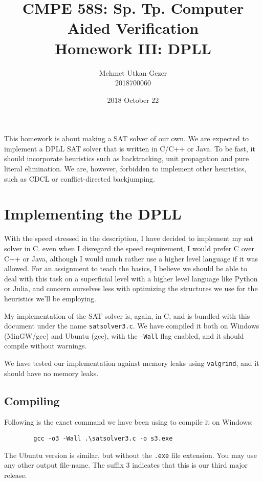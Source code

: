 \documentclass{article}
\title{CMPE 58S: Sp. Tp. Computer Aided Verification \\ Homework III: DPLL}
\date{2018 October 22}
\author{Mehmet Utkan Gezer \\ 2018700060}
\begin{document}
\maketitle

This homework is about making a SAT solver of our own.
We are expected to implement a DPLL SAT solver that is
written in C/C++ or Java. To be fast, it should incorporate
heuristics such as backtracking, unit propagation and
pure literal elimination. We are, however, forbidden to
implement other heuristics, such as CDCL or
conflict-directed backjumping.

\section{Implementing the DPLL}

With the speed stressed in the description, I have decided
to implement my sat solver in C. even when I disregard the
speed requirement, I would prefer C over C++ or Java,
although I would much rather use a higher level language
if it was allowed. For an assignment to teach the basics,
I believe we should be able to deal with this task on a
superficial level with a higher level language like
Python or Julia, and concern ourselves less with optimizing
the structures we use for the heuristics we'll be employing.

My implementation of the SAT solver is, again, in C, and
is bundled with this document under the name
\texttt{satsolver3.c}. We have compiled it both on
Windows (MinGW/gcc) and Ubuntu (gcc), with the
\texttt{-Wall} flag enabled, and it should compile
without warnings.

We have tested our implementation against memory
leaks using \texttt{valgrind}, and it should have no
memory leaks.

\subsection{Compiling}

Following is the exact command we have
been using to compile it on Windows:

\begin{center}
    \begin{verbatim}
        gcc -o3 -Wall .\satsolver3.c -o s3.exe
    \end{verbatim}
\end{center}

The Ubuntu version is similar, but without the \texttt{.exe}
file extension. You may use any other output file-name.
The suffix 3 indicates that this is our third major release.
\end{document}
